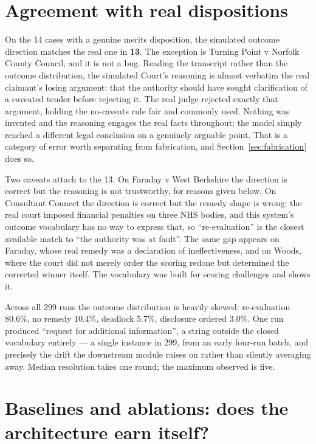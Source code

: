 \section{Agreement with real dispositions}
\label{sec:agreement}

On the 14 cases with a genuine merits disposition, the simulated outcome direction
matches the real one in \textbf{13}. The exception is Turning Point v Norfolk
County Council, and it is not a bug. Reading the transcript rather than the
outcome distribution, the simulated Court's reasoning is almost verbatim the real
claimant's losing argument: that the authority should have sought clarification of
a caveated tender before rejecting it. The real judge rejected exactly that
argument, holding the no-caveats rule fair and commonly used. Nothing was invented
and the reasoning engages the real facts throughout; the model simply reached a
different legal conclusion on a genuinely arguable point. That is a category of
error worth separating from fabrication, and Section~\ref{sec:fabrication} does so.

Two caveats attach to the 13. On Faraday v West Berkshire the direction is correct
but the reasoning is not trustworthy, for reasons given below. On Consultant
Connect the direction is correct but the remedy shape is wrong: the real court
imposed financial penalties on three NHS bodies, and this system's outcome
vocabulary has no way to express that, so ``re-evaluation'' is the closest
available match to ``the authority was at fault''. The same gap appears on Faraday,
whose real remedy was a declaration of ineffectiveness, and on Woods, where the
court did not merely order the scoring redone but determined the corrected winner
itself. The vocabulary was built for scoring challenges and shows it.

Across all 299 runs the outcome distribution is heavily skewed: re-evaluation
80.6\%, no remedy 10.4\%, deadlock 5.7\%, disclosure ordered 3.0\%. One run
produced ``request for additional information'', a string outside the closed
vocabulary entirely --- a single instance in 299, from an early four-run batch, and
precisely the drift the downstream module raises on rather than silently averaging
away. Median resolution takes one round; the maximum observed is five.

\section{Baselines and ablations: does the architecture earn itself?}
\label{sec:baselines}

